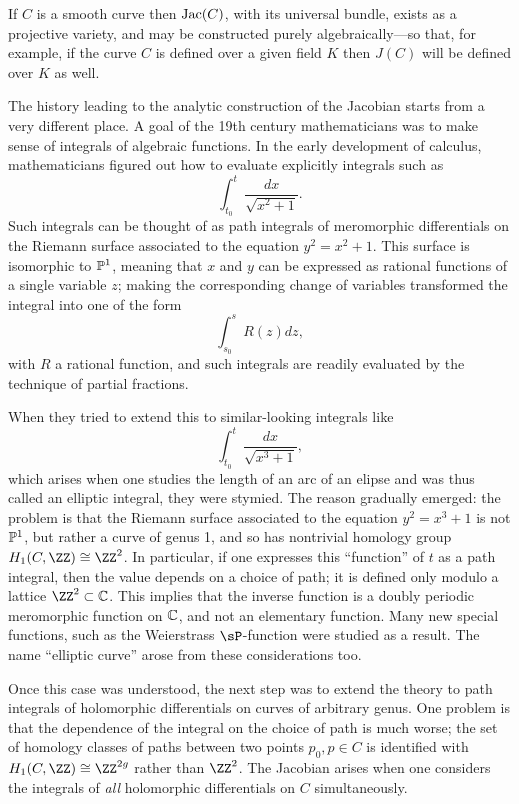 \begin{fact}
If $C$ is a smooth curve then $\Jac(C)$, with its universal bundle, exists as a projective variety, and may be constructed purely algebraically---so that, for example, if the curve $C$ is defined over a given field $K$ then $J(C)$ will be defined over $K$ as well.  
\end{fact}

The history leading to the analytic construction of the Jacobian starts from a very different place. A goal of the 19th century mathematicians was  to make sense of integrals of algebraic functions. In the early development of calculus, mathematicians figured out how to evaluate explicitly integrals such as
$$
\int_{t_0}^t \frac{dx}{\sqrt{x^2+1}}.
$$
Such integrals can be thought of as path integrals of meromorphic differentials on the Riemann surface associated to the equation $y^2 = x^2+1$. This surface is isomorphic to $\PP^1$, meaning that $x$ and $y$ can be expressed as rational functions of a single variable $z$; making the corresponding change of variables transformed the integral into one of the form
$$
\int_{s_0}^s R(z)dz,
$$
with $R$ a rational function, and such integrals are readily evaluated by the technique of partial fractions.

When they tried to extend this to similar-looking integrals like
$$
\int_{t_0}^t \frac{dx}{\sqrt{x^3+1}},
$$
which arises when one studies the length of an arc of an elipse and was thus called an elliptic integral, they were stymied. The reason gradually emerged: the problem is that the Riemann surface associated to the equation $y^2 = x^3+1$ is not $\PP^1$, but rather a curve of genus 1, and so has nontrivial homology group $H_1(C, \ZZ) \cong \ZZ^2$. In particular, if one expresses this ``function'' of $t$  as a path integral, then the value depends on a choice of path; it is defined only modulo a lattice $\ZZ^2 \subset \CC$. This implies that the inverse function is a doubly periodic meromorphic function on $\CC$, and not an elementary function. Many new special functions, such as the Weierstrass $\sP$-function were studied as a result. The name ``elliptic curve'' arose from these considerations too.

Once this case was understood, the next step was to extend the theory to path integrals of holomorphic differentials on curves of arbitrary genus. One problem is that the dependence of the integral on the choice of path is much worse; the set of homology classes of paths between two points $p_0, p \in C$ is identified with $H_1(C,\ZZ) \cong \ZZ^{2g}$ rather than $\ZZ^2$. The Jacobian arises when one considers the integrals of \emph{all} holomorphic differentials on $C$ simultaneously. 


